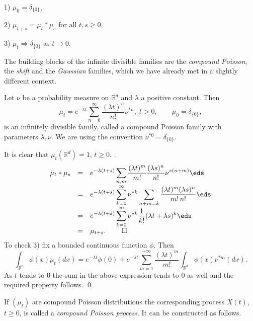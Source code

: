\documentclass[preprint]{imsart}
\def\R{\mathbb R}
\def\ds{\displaystyle}
\begin{document}
{1) $\mu_0=\delta_{\{0\}}$,

2) $\mu_{t+s}=\mu_t*\mu_s$ for all $t,s\geq 0$,

3) $\mu_t\Rightarrow \delta_{\{0\}}$ as $t\to 0$.


\noindent The building blocks of the infinite divisible families are the {\it compound Poisson}, the {\it shift}
and the {\it Gaussian}
 families, which we have already met in a slightly different context.
\begin{Proposition} Let $\nu$ be a probability measure on   $\R^d$ and
$\lambda $ a positive constant. Then
$$
\mu_t=e^{-\lambda t} \sum
_{n=0}^{\infty} \frac{(\lambda t)^n}{n!}
\nu^{*n},\; t>0,
\qquad
\mu_0=\delta_{\{0\}},
$$
is an infinitely divisible family, called a compound Poisson family with parameters $\lambda, \nu$.
We  are using the convention $\nu^{*0}=\delta_{\{0\}}$.
\end{Proposition}
It is clear that $\mu_t(\R^d)=1$, $t\geq 0$. .
$$
  \begin{array}{lll}
    \mu_t*\mu_s & =&\ds
e^{-\lambda (t+s)} \sum_{n,m}
\frac{(\lambda t)^m}{m!}\frac{(\lambda s)^n}{n!}
\nu^{*(n+m)}
     \eds\\
      & = &\ds
e^{-\lambda (t+s)} \sum_{k=0}^\infty
\nu^{*k}\sum_{n+m=k}
\frac{(\lambda t)^m(\lambda s)^n}{m!\, n!}
\eds\\
      & = &\ds
e^{-\lambda (t+s)} \sum_{k=0}^\infty
\nu^{*k}
\frac{1}{k!} (\lambda t+\lambda s)^k
\eds\\
      &=&\mu_{t+s}.\; \qed
  \end{array}
$$
To check 3) fix a bounded continuous function $\phi$. Then
$$
\int_{\R^d}\phi (x) \mu_{t}(dx) = e^{- \lambda t} \phi (0) + e^{- \lambda t}\sum_{m=1}^
{+\infty}\frac{(\lambda t)^m}{m!}\int_{\R^d}\phi (x) \nu^{*m}(dx).
$$
As $t$ tends to $0$ the sum in the above expression tends to $0$ as well and the required property follows. \qed



\noindent If $(\mu_t)$ are compound Poisson distributions the
corresponding process $X(t)$, $t\geq 0$, is called a
{\it compound Poisson process}. It can be constructed as follows.
\vspace{2mm}

}
\end{document}
